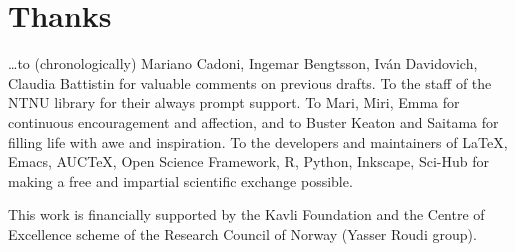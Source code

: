 \documentclass[a4paper,12pt,onecolumn,oneside,article,british]{memoir}
\renewcommand*{\finalnamedelim}{\addspace\amp\space}
\newcommand*{\citep}{\footcites}
\newcommand*{\amp}{\&}
\newenvironment{acknowledgements}{\section*{Thanks}\addcontentsline{toc}{section}{Thanks}}{\par}
\newcommand*{\sect}{\S}%
\newcommand*{\chap}{ch.}%
\newcommand*{\eqn}{eq.}%
\newcommand*{\eqns}{eqs}%
\begin{document}


\begin{acknowledgements}
  \ldots to (chronologically) Mariano Cadoni, Ingemar Bengtsson, Iv\'an
  Davidovich, Claudia Battistin for valuable comments on previous drafts.
  To the staff of the NTNU library for their always prompt support. To
  Mari, Miri, Emma for continuous encouragement and affection, and to
  Buster Keaton and Saitama for filling life with awe and inspiration. To
  the developers and maintainers of \LaTeX, Emacs, AUC\TeX, Open Science
  Framework, R, Python, Inkscape, Sci-Hub for making a free and impartial
  scientific exchange possible.

  This work is financially supported by the Kavli Foundation and the Centre
  of Excellence scheme of the Research Council of Norway (Yasser Roudi
  group).
\end{acknowledgements}

\renewcommand*{\finalnamedelim}{\addcomma\space}

\printbibliography[prenote=prenote]
\end{document}
